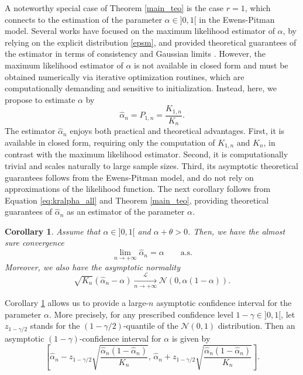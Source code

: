 \documentclass[twoside,12pt]{article}
\newcommand{\cL}{\mathcal{L}}
\newcommand{\cN}{\mathcal{N}}
\newtheorem{cor}[thm]{Corollary}
\begin{document}
A noteworthy special case of Theorem \ref{main_teo} is the case $r=1$, which connects to the estimation of the parameter $\alpha\in]0,1[$ in the Ewens-Pitman model. Several works have focused on the maximum likelihood estimator of $\alpha$, by relying on the explicit distribution \eqref{epsm}, and provided theoretical guarantees of the estimator in terms of consistency and Gaussian limits \citep{Fra(22),FN(21),Bal(24)}. However, the maximum likelihood estimator of $\alpha$ is not available in closed form and must be obtained numerically via iterative optimization routines, which are computationally demanding and sensitive to initialization. Instead, here, we propose to estimate $\alpha$ by
\begin{equation*}
\widehat{\alpha}_{n}=P_{1,n}=\frac{K_{1,n}}{K_{n}}.
\end{equation*}
The estimator $\widehat{\alpha}_{n}$ enjoys both practical and theoretical advantages. First, it is available in closed form, requiring only the computation of $K_{1,n}$ and $K_n$, in contrast with the maximum likelihood estimator. Second, it is computationally trivial and scales naturally to large sample sizes. Third, its asymptotic theoretical guarantees follows from the Ewens-Pitman model, and do not rely on approximations of the likelihood function. The next corollary follows from Equation \eqref{eq:kralpha_all} and Theorem \ref{main_teo}, providing theoretical guarantees of $\widehat{\alpha}_{n}$ as an estimator of the parameter $\alpha$.
\begin{cor}
\label{main_cor}
Assume that $\alpha\in]0,1[$ and  $\alpha+\theta>0$. Then, we have the almost sure convergence
\begin{equation}
\label{ASCVGALPHA}
\lim_{n\rightarrow+\infty}\widehat{\alpha}_{n}=\alpha\qquad\text{a.s.}
\end{equation}
Moreover, we also have the asymptotic normality
\begin{equation}
\label{WCVGALPHA}
\sqrt{K_n}( \widehat{\alpha}_{n} -\alpha )
\underset{n\rightarrow+\infty}{\overset{\cL}{\longrightarrow}}
\mathscr{N}(0, \alpha(1-\alpha)).
\end{equation} 
\end{cor}

Corollary \ref{main_cor} allows us to provide a large-$n$ asymptotic confidence interval for the parameter $\alpha$. More precisely, for any prescribed confidence level $1-\gamma\in]0,1[$, let $z_{1-\gamma/2}$ stands for the $(1-\gamma/2)$-quantile of the $\cN(0,1)$ distribution. Then an asymptotic $(1-\gamma)$-confidence interval for $\alpha$ is given by
\begin{equation}\label{CI_alpha}
\left[\widehat{\alpha}_{n} - z_{1-\gamma/2}\sqrt{\frac{\widehat{\alpha}_{n}(1-\widehat{\alpha}_{n})}{K_n}},\,\widehat{\alpha}_{n} + z_{1-\gamma/2}\sqrt{\frac{\widehat{\alpha}_{n}(1-\widehat{\alpha}_{n})}{K_n}}
\right].
\end{equation}
\end{document}
